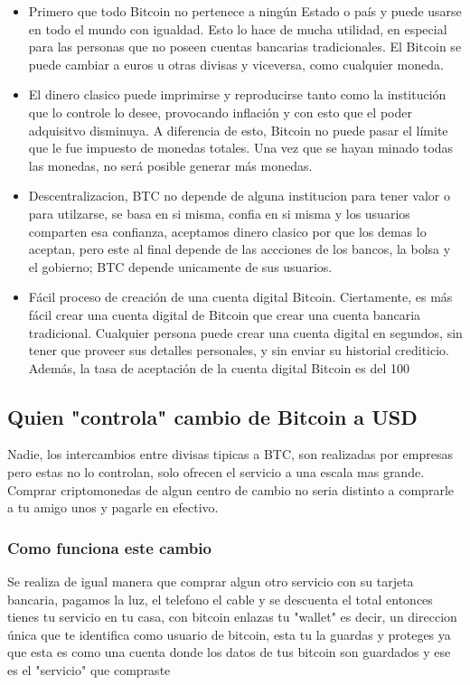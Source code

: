 \documentclass[12pt,letterpaper]{article}
\begin{document}
    \begin{itemize}
	    \item Primero que todo Bitcoin no pertenece a ning\'un Estado o pa\'is y puede usarse en todo el mundo con igualdad. Esto lo hace de mucha utilidad, en especial para las personas que no poseen cuentas bancarias tradicionales. El Bitcoin se puede cambiar a euros u otras divisas y viceversa, como cualquier moneda. 
	
        \item El dinero clasico puede imprimirse y reproducirse tanto como la instituci\'on que lo controle lo desee, provocando inflaci\'on y con esto que el poder adquisitvo disminuya. A diferencia de esto, Bitcoin no puede pasar el l\'imite que le fue impuesto de monedas totales. Una vez que se hayan minado todas las monedas, no ser\'a posible generar m\'as monedas.
	
	    \item Descentralizacion, BTC no depende de alguna institucion para tener valor o para utilzarse, se basa en si misma, confia en si misma y los usuarios comparten esa confianza, aceptamos dinero clasico por que los demas lo aceptan, pero este al final depende de las accciones de los bancos, la bolsa y el gobierno; BTC depende unicamente de sus usuarios.
	
	    \item F\'acil proceso de creaci\'on de una cuenta digital Bitcoin. Ciertamente, es m\'as f\'acil crear una cuenta digital de Bitcoin que crear una cuenta bancaria tradicional. Cualquier persona puede crear una cuenta digital en segundos, sin tener que proveer sus detalles personales, y sin enviar su historial crediticio. Adem\'as, la tasa de aceptaci\'on de la cuenta digital Bitcoin es del 100%
    
    \end{itemize}
	
	\subsection*{Quien "controla" cambio de Bitcoin a USD}
	Nadie, los intercambios entre divisas tipicas a BTC, son realizadas por empresas pero estas no lo controlan, solo ofrecen el servicio a una escala mas grande. Comprar criptomonedas de algun centro de cambio no seria distinto a comprarle a tu amigo unos y pagarle en efectivo.

		\subsubsection*{Como funciona este cambio}
        Se realiza de igual manera que comprar algun otro servicio con su tarjeta bancaria, pagamos la luz, el telefono el cable y se descuenta el total entonces tienes tu servicio en tu casa, con bitcoin enlazas tu "wallet" es decir, un direccion \'unica que te identifica como usuario de bitcoin, esta tu la guardas y proteges ya que esta es como una cuenta donde los datos de tus bitcoin son guardados y ese es el "servicio" que compraste
\end{document}
